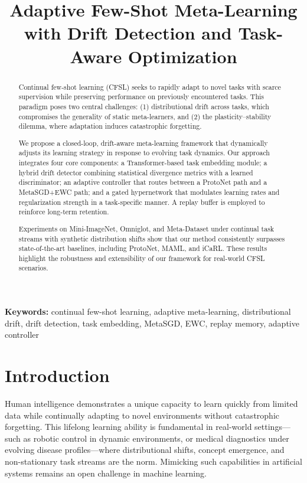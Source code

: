 \documentclass[conference]{IEEEtran}
\title{Adaptive Few-Shot Meta-Learning with Drift Detection and Task-Aware Optimization}
\author{
    \IEEEauthorblockN{Yiming Yuan}
    \IEEEauthorblockA{Artificial Intelligence\\
    The University of Auckland\\
    \href{mailto:yyua459@aucklanduni.ac.nz}{yyua459@aucklanduni.ac.nz}}
}
\begin{document}
\maketitle

\begin{abstract}
Continual few-shot learning (CFSL) seeks to rapidly adapt to novel tasks with scarce supervision while preserving performance on previously encountered tasks. This paradigm poses two central challenges: (1) distributional drift across tasks, which compromises the generality of static meta-learners, and (2) the plasticity–stability dilemma, where adaptation induces catastrophic forgetting.

We propose a closed-loop, drift-aware meta-learning framework that dynamically adjusts its learning strategy in response to evolving task dynamics. Our approach integrates four core components: a Transformer-based task embedding module; a hybrid drift detector combining statistical divergence metrics with a learned discriminator; an adaptive controller that routes between a ProtoNet path and a MetaSGD+EWC path; and a gated hypernetwork that modulates learning rates and regularization strength in a task-specific manner. A replay buffer is employed to reinforce long-term retention.

Experiments on Mini-ImageNet, Omniglot, and Meta-Dataset under continual task streams with synthetic distribution shifts show that our method consistently surpasses state-of-the-art baselines, including ProtoNet, MAML, and iCaRL. These results highlight the robustness and extensibility of our framework for real-world CFSL scenarios.
\end{abstract}



\vspace{0.5em}
\noindent\textbf{Keywords:} continual few-shot learning, adaptive meta-learning, distributional drift, drift detection, task embedding, MetaSGD, EWC, replay memory, adaptive controller



\section{Introduction}

Human intelligence demonstrates a unique capacity to learn quickly from limited data while continually adapting to novel environments without catastrophic forgetting. This lifelong learning ability is fundamental in real-world settings—such as robotic control in dynamic environments, or medical diagnostics under evolving disease profiles—where distributional shifts, concept emergence, and non-stationary task streams are the norm. Mimicking such capabilities in artificial systems remains an open challenge in machine learning.
\end{document}
